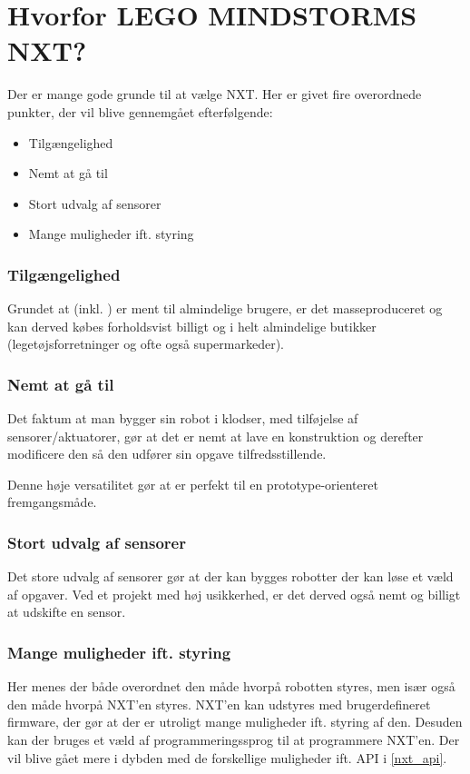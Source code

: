 \section{Hvorfor LEGO MINDSTORMS NXT?}
Der er mange gode grunde til at vælge \legoms NXT.
Her er givet fire overordnede punkter, der vil blive gennemgået efterfølgende:

\begin{itemize}
\item{Tilgængelighed}
\item{Nemt at gå til}
\item{Stort udvalg af sensorer}
\item{Mange muligheder ift. styring}
\end{itemize}

\subsubsection{Tilgængelighed}
Grundet at \lego (inkl. \legoms) er ment til almindelige brugere, er det masseproduceret og kan derved købes forholdsvist billigt og i helt almindelige butikker (legetøjsforretninger og ofte også supermarkeder).

\subsubsection{Nemt at gå til}
Det faktum at man bygger sin robot i \lego klodser, med tilføjelse af \legoms sensorer/aktuatorer, gør at det er nemt at lave en konstruktion og derefter modificere den så den udfører sin opgave tilfredsstillende.

Denne høje versatilitet gør at \lego er perfekt til en prototype-orienteret fremgangsmåde.

\subsubsection{Stort udvalg af sensorer}
Det store udvalg af sensorer gør at der kan bygges robotter der kan løse et væld af opgaver.
Ved et projekt med høj usikkerhed, er det derved også nemt og billigt at udskifte en sensor.

\subsubsection{Mange muligheder ift. styring}
Her menes der både overordnet den måde hvorpå robotten styres, men især også den måde hvorpå NXT'en styres.
NXT'en kan udstyres med brugerdefineret firmware, der gør at der er utroligt mange muligheder ift. styring af den.
Desuden kan der bruges et væld af programmeringssprog til at programmere NXT'en.
Der vil blive gået mere i dybden med de forskellige muligheder ift. API i \cref{nxt_api}.



